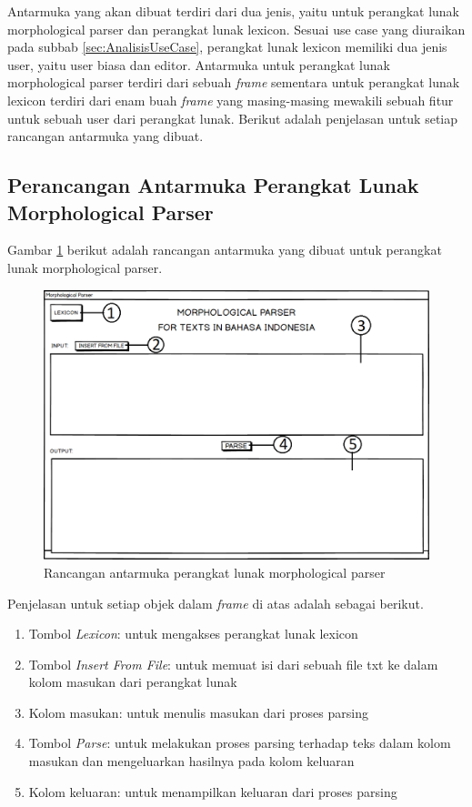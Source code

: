 Antarmuka yang akan dibuat terdiri dari dua jenis, yaitu untuk perangkat lunak morphological parser dan perangkat lunak lexicon. Sesuai use case yang diuraikan pada subbab \ref{sec:AnalisisUseCase}, perangkat lunak lexicon memiliki dua jenis user, yaitu user biasa dan editor. Antarmuka untuk perangkat lunak morphological parser terdiri dari sebuah \textit{frame} sementara untuk perangkat lunak lexicon terdiri dari enam buah \textit{frame} yang masing-masing mewakili sebuah fitur untuk sebuah user dari perangkat lunak. Berikut adalah penjelasan untuk setiap rancangan antarmuka yang dibuat.

\subsection{Perancangan Antarmuka Perangkat Lunak Morphological Parser}
\label{sec:antarmukaParser}

Gambar \ref{mockup-parser} berikut adalah rancangan antarmuka yang dibuat untuk perangkat lunak morphological parser.

\begin{figure}[H]
\centering
\includegraphics[scale=0.7]{Gambar/mockup-parser}
\caption{Rancangan antarmuka perangkat lunak morphological parser} 
\label{mockup-parser}
\end{figure}

Penjelasan untuk setiap objek dalam \textit{frame} di atas adalah sebagai berikut.

\begin{enumerate}
	\item Tombol \textit{Lexicon}: untuk mengakses perangkat lunak lexicon
	\item Tombol \textit{Insert From File}: untuk memuat isi dari sebuah file txt ke dalam kolom masukan dari perangkat lunak
	\item Kolom masukan: untuk menulis masukan dari proses parsing
	\item Tombol \textit{Parse}: untuk melakukan proses parsing terhadap teks dalam kolom masukan dan mengeluarkan hasilnya pada kolom keluaran
	\item Kolom keluaran: untuk menampilkan keluaran dari proses parsing
\end{enumerate}

